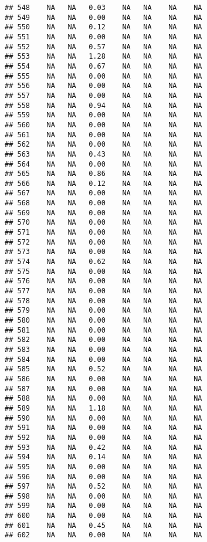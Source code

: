 \documentclass{article}\usepackage{graphicx, color}
\makeatletter
\newenvironment{kframe}{%
 \def\at@end@of@kframe{}%
 \ifinner\ifhmode%
  \def\at@end@of@kframe{\end{minipage}}%
  \begin{minipage}{\columnwidth}%
 \fi\fi%
 \def\FrameCommand##1{\hskip\@totalleftmargin \hskip-\fboxsep
 \colorbox{shadecolor}{##1}\hskip-\fboxsep
     \hskip-\linewidth \hskip-\@totalleftmargin \hskip\columnwidth}%
 \MakeFramed {\advance\hsize-\width
   \@totalleftmargin\z@ \linewidth\hsize
   \@setminipage}}%
 {\par\unskip\endMakeFramed%
 \at@end@of@kframe}
\newenvironment{knitrout}{}{} %
\makeatother
\begin{document}
\begin{knitrout}
\begin{kframe}
\begin{verbatim}
## 548    NA   NA   0.03    NA   NA    NA    NA
## 549    NA   NA   0.00    NA   NA    NA    NA
## 550    NA   NA   0.12    NA   NA    NA    NA
## 551    NA   NA   0.00    NA   NA    NA    NA
## 552    NA   NA   0.57    NA   NA    NA    NA
## 553    NA   NA   1.28    NA   NA    NA    NA
## 554    NA   NA   0.67    NA   NA    NA    NA
## 555    NA   NA   0.00    NA   NA    NA    NA
## 556    NA   NA   0.00    NA   NA    NA    NA
## 557    NA   NA   0.00    NA   NA    NA    NA
## 558    NA   NA   0.94    NA   NA    NA    NA
## 559    NA   NA   0.00    NA   NA    NA    NA
## 560    NA   NA   0.00    NA   NA    NA    NA
## 561    NA   NA   0.00    NA   NA    NA    NA
## 562    NA   NA   0.00    NA   NA    NA    NA
## 563    NA   NA   0.43    NA   NA    NA    NA
## 564    NA   NA   0.00    NA   NA    NA    NA
## 565    NA   NA   0.86    NA   NA    NA    NA
## 566    NA   NA   0.12    NA   NA    NA    NA
## 567    NA   NA   0.00    NA   NA    NA    NA
## 568    NA   NA   0.00    NA   NA    NA    NA
## 569    NA   NA   0.00    NA   NA    NA    NA
## 570    NA   NA   0.00    NA   NA    NA    NA
## 571    NA   NA   0.00    NA   NA    NA    NA
## 572    NA   NA   0.00    NA   NA    NA    NA
## 573    NA   NA   0.00    NA   NA    NA    NA
## 574    NA   NA   0.62    NA   NA    NA    NA
## 575    NA   NA   0.00    NA   NA    NA    NA
## 576    NA   NA   0.00    NA   NA    NA    NA
## 577    NA   NA   0.00    NA   NA    NA    NA
## 578    NA   NA   0.00    NA   NA    NA    NA
## 579    NA   NA   0.00    NA   NA    NA    NA
## 580    NA   NA   0.00    NA   NA    NA    NA
## 581    NA   NA   0.00    NA   NA    NA    NA
## 582    NA   NA   0.00    NA   NA    NA    NA
## 583    NA   NA   0.00    NA   NA    NA    NA
## 584    NA   NA   0.00    NA   NA    NA    NA
## 585    NA   NA   0.52    NA   NA    NA    NA
## 586    NA   NA   0.00    NA   NA    NA    NA
## 587    NA   NA   0.00    NA   NA    NA    NA
## 588    NA   NA   0.00    NA   NA    NA    NA
## 589    NA   NA   1.18    NA   NA    NA    NA
## 590    NA   NA   0.00    NA   NA    NA    NA
## 591    NA   NA   0.00    NA   NA    NA    NA
## 592    NA   NA   0.00    NA   NA    NA    NA
## 593    NA   NA   0.42    NA   NA    NA    NA
## 594    NA   NA   0.14    NA   NA    NA    NA
## 595    NA   NA   0.00    NA   NA    NA    NA
## 596    NA   NA   0.00    NA   NA    NA    NA
## 597    NA   NA   0.52    NA   NA    NA    NA
## 598    NA   NA   0.00    NA   NA    NA    NA
## 599    NA   NA   0.00    NA   NA    NA    NA
## 600    NA   NA   0.00    NA   NA    NA    NA
## 601    NA   NA   0.45    NA   NA    NA    NA
## 602    NA   NA   0.00    NA   NA    NA    NA

\end{verbatim}
\end{kframe}
\end{knitrout}
\end{document}
